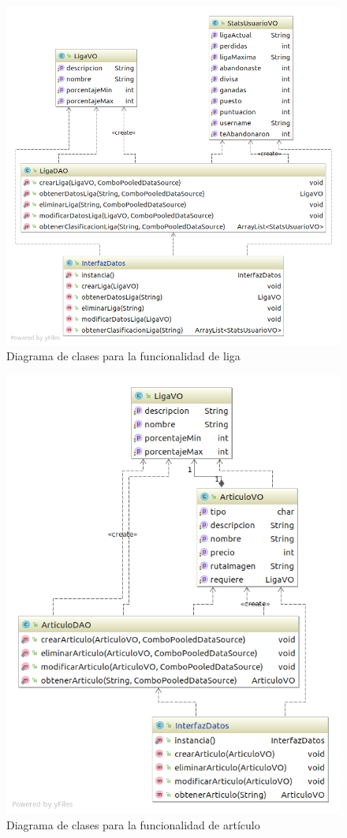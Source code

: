 \documentclass[]{article}
\begin{document}
\begin{figure}[H]
\centering
\includegraphics[scale = 0.5]{figuras/base_datos/clasesLiga.png}
\caption{Diagrama de clases para la funcionalidad de liga}
\label{fig:diagramaClasesLiga}
\end{figure}
\begin{figure}[H]
\centering
\includegraphics[scale = 0.5]{figuras/base_datos/clasesArticulo.png}
\caption{Diagrama de clases para la funcionalidad de artículo}
\label{fig:diagramaClasesArticulo}
\end{figure}
\end{document}
